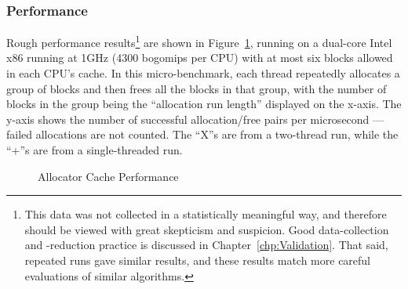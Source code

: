 \subsubsection{Performance}

Rough performance results\footnote{
	This data was not collected in a statistically meaningful way,
	and therefore should be viewed with great skepticism and suspicion.
	Good data-collection and -reduction practice is discussed
	in Chapter~\ref{chp:Validation}.
	That said, repeated runs gave similar results, and these results
	match more careful evaluations of similar algorithms.}
are shown in
Figure~\ref{fig:SMPdesign:Allocator Cache Performance},
running on a dual-core Intel x86 running at 1GHz (4300 bogomips per CPU)
with at most six blocks allowed in each CPU's cache.
In this micro-benchmark,
each thread repeatedly allocates a group of blocks and then frees all
the blocks in that group, with
the number of blocks in the group being the ``allocation run length''
displayed on the x-axis.
The y-axis shows the number of successful allocation/free pairs per
microsecond --- failed allocations are not counted.
The ``X''s are from a two-thread run, while the ``+''s are from a
single-threaded run.

\begin{figure}[htb]
\begin{center}
\end{center}
\caption{Allocator Cache Performance}
\label{fig:SMPdesign:Allocator Cache Performance}
\end{figure}

